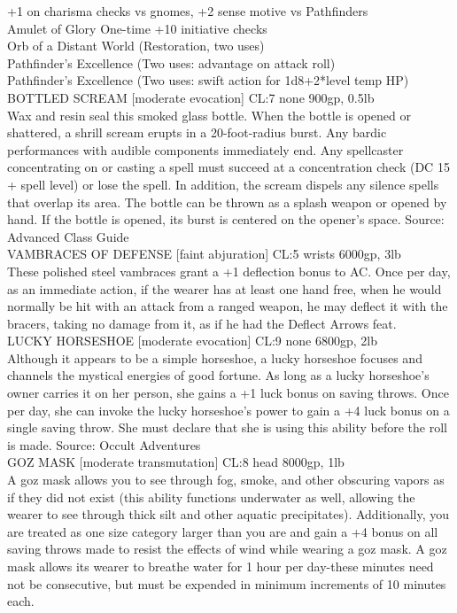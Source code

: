 {+1 on charisma checks vs gnomes, +2 sense motive vs Pathfinders \\
Amulet of Glory One-time +10 initiative checks\\
Orb of a Distant World (Restoration, two uses) \\
Pathfinder's Excellence (Two uses: advantage on attack roll)\\
Pathfinder's Excellence (Two uses: swift action for 1d8+2*level temp HP)\\

BOTTLED SCREAM [moderate evocation] CL:7 none 900gp, 0.5lb \\
Wax and resin seal this smoked glass bottle. When the bottle is opened or shattered, a shrill scream erupts in a 20-foot-radius burst. Any bardic performances with audible components immediately end. Any spellcaster concentrating on or casting a spell must succeed at a concentration check (DC 15 + spell level) or lose the spell. In addition, the
scream dispels any silence spells that overlap its area. The bottle can be thrown as a splash weapon or opened by hand. If the bottle is opened, its burst is centered on the opener's space. Source: Advanced Class Guide\\

VAMBRACES OF DEFENSE [faint abjuration] CL:5 wrists 6000gp, 3lb \\
These polished steel vambraces grant a +1 deflection bonus to AC. Once per day, as an immediate action, if the wearer has at least one hand free, when he would normally be hit with an attack from a ranged weapon, he may deflect it with the bracers, taking no damage from it, as if he had the Deflect Arrows feat.\\

LUCKY HORSESHOE [moderate evocation] CL:9 none 6800gp, 2lb\\
Although it appears to be a simple horseshoe, a lucky horseshoe focuses and channels the mystical energies of good fortune. As long as a lucky horseshoe's owner carries it on her person, she gains a +1 luck bonus on saving throws. Once per day, she can invoke the lucky horseshoe's power to gain a +4 luck bonus on a single saving throw. She must
declare that she is using this ability before the roll is made. Source: Occult Adventures\\

GOZ MASK [moderate transmutation] CL:8 head 8000gp, 1lb\\
A goz mask allows you to see through fog, smoke, and other obscuring vapors as if they did not exist (this ability functions underwater as well, allowing the wearer to see through thick silt and other aquatic precipitates). Additionally, you are treated as one size category larger than you are and gain a +4 bonus on all saving throws made to resist the effects of wind while wearing a goz mask.
A goz mask allows its wearer to breathe water for 1 hour per day-these minutes need not be consecutive, but must be expended in minimum increments of 10 minutes each.\\

}

